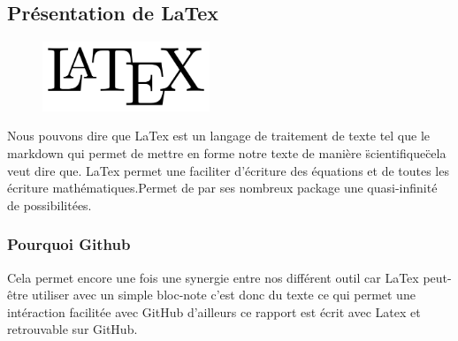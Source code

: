 \subsection{Présentation de LaTex}

\begin{figure}[h]
  \begin{center}
\includegraphics[width=5cm]{./images/Latex.png}
\end{center}
\end{figure}

Nous pouvons dire que LaTex est un langage de traitement de texte tel que le markdown qui permet de mettre en forme notre texte de manière \"scientifique\" cela veut dire que. LaTex permet une faciliter d'écriture des équations et de toutes les écriture mathématiques.Permet de par ses nombreux package une quasi-infinité de possibilitées.

\subsubsection{Pourquoi Github}
Cela permet encore une fois une synergie entre nos différent outil car LaTex peut-être utiliser avec un simple bloc-note c'est donc du texte ce qui permet une intéraction facilitée avec GitHub d'ailleurs ce rapport est écrit avec Latex et retrouvable sur GitHub.






